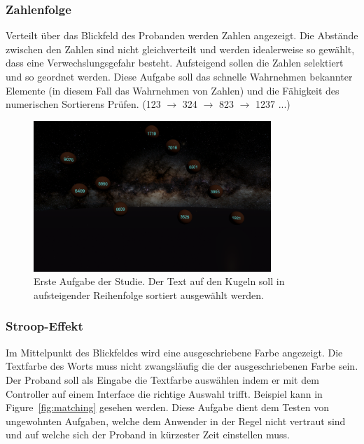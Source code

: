\subsubsection{Zahlenfolge} 
Verteilt über das Blickfeld des Probanden werden Zahlen angezeigt. Die Abstände zwischen den Zahlen sind nicht gleichverteilt und werden idealerweise so gewählt, dass eine Verwechslungsgefahr besteht. Aufsteigend sollen die Zahlen selektiert und so geordnet werden. Diese Aufgabe soll das schnelle Wahrnehmen bekannter Elemente (in diesem Fall das Wahrnehmen von Zahlen) und die Fähigkeit des numerischen Sortierens Prüfen. 
(123 $\rightarrow$ 324 $\rightarrow$ 823 $\rightarrow$ 1237 ...)
\begin{figure}
	\centering
	\includegraphics[width=0.8\textwidth]{./images/ordering.png}
	\caption{Erste Aufgabe der Studie. Der Text auf den Kugeln soll in aufsteigender Reihenfolge sortiert ausgewählt werden.}
	\label{fig:ordeing}
\end{figure}

\subsubsection{Stroop-Effekt} 
Im Mittelpunkt des Blickfeldes wird eine ausgeschriebene Farbe angezeigt. Die Textfarbe des Worts muss nicht zwangsläufig die der ausgeschriebenen Farbe sein. Der Proband soll als Eingabe die Textfarbe auswählen indem er mit dem Controller auf einem Interface die richtige Auswahl trifft. Beispiel kann in Figure~\ref{fig:matching} gesehen werden. Diese Aufgabe dient dem Testen von ungewohnten Aufgaben, welche dem Anwender in der Regel nicht vertraut sind und auf welche sich der Proband in kürzester Zeit einstellen muss.

